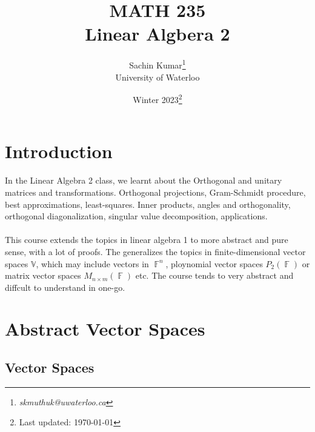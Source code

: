 \documentclass[10pt]{article}
\DeclareMathOperator{\F}{{\mathbb{F}}}
\theoremstyle{break}
\newcommand{\subject}{MATH 235 \\ Linear Algbera 2}
\newcommand{\semester}{Winter 2023}
\begin{document}
\let\ref\Cref

\title{\subject}
\author{Sachin Kumar\thanks{\itshape skmuthuk@uwaterloo.ca}\\ University of Waterloo}
\date{\semester\thanks{Last updated: \today}}

\maketitle
\newpage
\tableofcontents
\setcounter{section}{-1}
\newpage







\section{Introduction}
In the Linear Algebra 2 class, we learnt about the Orthogonal and unitary matrices and transformations. Orthogonal projections, Gram-Schmidt procedure, best approximations, least-squares. Inner products, angles and orthogonality, orthogonal diagonalization, singular value decomposition, applications.
\\ \vspace{0.5ex} \\
This course extends the topics in linear algebra 1 to more abstract and pure sense, with a lot of proofs. The generalizes the topics in finite-dimensional vector spaces $\mathbb{V}$, which may include vectors in $\F^n$, ploynomial vector spaces $P_{2}(\F)$ or matrix vector spaces $M_{n \times m}(\F)$ etc. The course tends to very abstract and diffcult to understand in one-go.

\newpage


\section{Abstract Vector Spaces}
\subsection{Vector Spaces}
\end{document}
